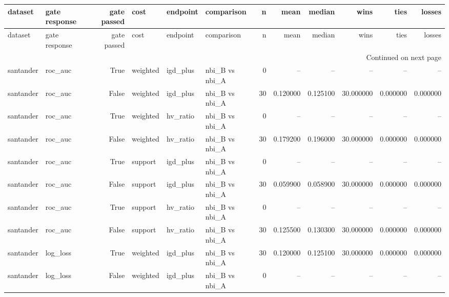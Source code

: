 \begin{center}\label{tab:s6cond}\end{center}
\begingroup\tiny\setlength{\tabcolsep}{2.5pt}
\begin{longtable}{llrlllrrrrrr}
\toprule
dataset & gate response & gate passed & cost & endpoint & comparison & n & mean & median & wins & ties & losses \\
\midrule
\endfirsthead
\toprule
dataset & gate response & gate passed & cost & endpoint & comparison & n & mean & median & wins & ties & losses \\
\midrule
\endhead
\midrule
\multicolumn{12}{r}{Continued on next page} \\
\midrule
\endfoot
\bottomrule
\endlastfoot
santander & roc\_auc & True & weighted & igd\_plus & nbi\_B vs nbi\_A & 0 & -- & -- & -- & -- & -- \\
santander & roc\_auc & False & weighted & igd\_plus & nbi\_B vs nbi\_A & 30 & 0.120000 & 0.125100 & 30.000000 & 0.000000 & 0.000000 \\
santander & roc\_auc & True & weighted & hv\_ratio & nbi\_B vs nbi\_A & 0 & -- & -- & -- & -- & -- \\
santander & roc\_auc & False & weighted & hv\_ratio & nbi\_B vs nbi\_A & 30 & 0.179200 & 0.196000 & 30.000000 & 0.000000 & 0.000000 \\
santander & roc\_auc & True & support & igd\_plus & nbi\_B vs nbi\_A & 0 & -- & -- & -- & -- & -- \\
santander & roc\_auc & False & support & igd\_plus & nbi\_B vs nbi\_A & 30 & 0.059900 & 0.058900 & 30.000000 & 0.000000 & 0.000000 \\
santander & roc\_auc & True & support & hv\_ratio & nbi\_B vs nbi\_A & 0 & -- & -- & -- & -- & -- \\
santander & roc\_auc & False & support & hv\_ratio & nbi\_B vs nbi\_A & 30 & 0.125500 & 0.130300 & 30.000000 & 0.000000 & 0.000000 \\
santander & log\_loss & True & weighted & igd\_plus & nbi\_B vs nbi\_A & 30 & 0.120000 & 0.125100 & 30.000000 & 0.000000 & 0.000000 \\
santander & log\_loss & False & weighted & igd\_plus & nbi\_B vs nbi\_A & 0 & -- & -- & -- & -- & -- \\

\end{longtable}
